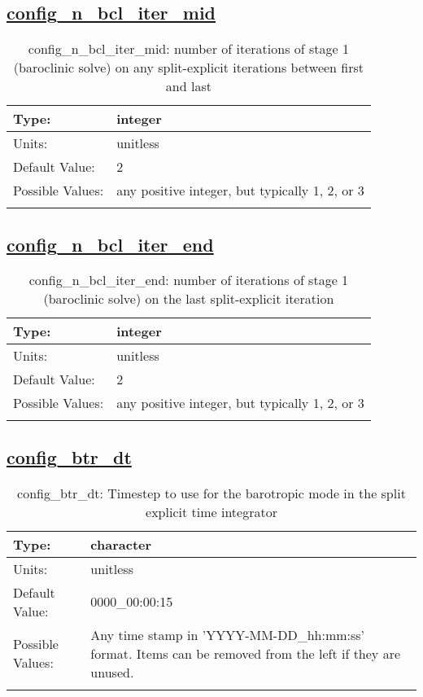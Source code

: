 \subsection[config\_n\_bcl\_iter\_mid]{\hyperref[sec:nm_tab_split_explicit_ts]{config\_n\_bcl\_iter\_mid}}
\label{subsec:nm_sec_config_n_bcl_iter_mid}
\begin{center}
\begin{longtable}{| p{2.0in} || p{4.0in} |}
    \hline
    Type: & integer \\
    \hline
    Units: & \si{unitless} \\
    \hline
    Default Value: & 2 \\
    \hline
    Possible Values: & any positive integer, but typically 1, 2, or 3 \\
    \hline
    \caption{config\_n\_bcl\_iter\_mid: number of iterations of stage 1 (baroclinic solve) on any split-explicit iterations between first and last}
\end{longtable}
\end{center}
\subsection[config\_n\_bcl\_iter\_end]{\hyperref[sec:nm_tab_split_explicit_ts]{config\_n\_bcl\_iter\_end}}
\label{subsec:nm_sec_config_n_bcl_iter_end}
\begin{center}
\begin{longtable}{| p{2.0in} || p{4.0in} |}
    \hline
    Type: & integer \\
    \hline
    Units: & \si{unitless} \\
    \hline
    Default Value: & 2 \\
    \hline
    Possible Values: & any positive integer, but typically 1, 2, or 3 \\
    \hline
    \caption{config\_n\_bcl\_iter\_end: number of iterations of stage 1 (baroclinic solve) on the last split-explicit iteration}
\end{longtable}
\end{center}
\subsection[config\_btr\_dt]{\hyperref[sec:nm_tab_split_explicit_ts]{config\_btr\_dt}}
\label{subsec:nm_sec_config_btr_dt}
\begin{center}
\begin{longtable}{| p{2.0in} || p{4.0in} |}
    \hline
    Type: & character \\
    \hline
    Units: & \si{unitless} \\
    \hline
    Default Value: & 0000\_00:00:15 \\
    \hline
    Possible Values: & Any time stamp in 'YYYY-MM-DD\_hh:mm:ss' format. Items can be removed from the left if they are unused. \\
    \hline
    \caption{config\_btr\_dt: Timestep to use for the barotropic mode in the split explicit time integrator}
\end{longtable}
\end{center}
